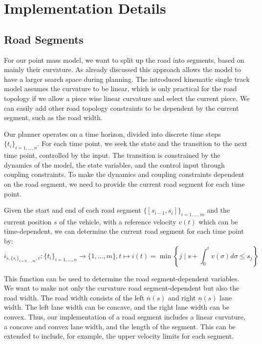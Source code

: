 \section{Implementation Details} \label{sec:implementation_details}

\subsection{Road Segments}

For our point mass model, we want to split up the road into segments, based on mainly their curvature.
As already discussed this approach allows the model to have a larger search space during planning.
The introduced kinematic single track model assumes the curvature to be linear, which is only practical for the road topology if we allow a piece
wise linear curvature and select the current piece.
We can easily add other road topology constraints to be dependent by the current segment, such as the road width.

Our planner operates on a time horizon, divided into discrete time steps $\{t_i\}_{i=1,\dots,n}$.
For each time point, we seek the state and the transition to the next time point, controlled by the input.
The transition is constrained by the dynamics of the model, the state variables, and the control input through coupling constraints.
To make the dynamics and coupling constraints dependent on the road segment, we need to provide the current road segment for each time point.

Given the start and end of each road segment $\{[s_{i-1}, s_{i}]\}_{i=1,\dots,m}$ and the current position $s$ of the vehicle, with a reference velocity
$v(t)$ which can be time-dependent, we can determine the current road segment for each time point by:
\begin{equation}
	i_{s, \{s_{i}\}_{i=0,\dots,m}, v}: \{t_i\}_{i=1,\dots,n} \to \{1,\dots,m\}, t \mapsto i(t) = \min \left\{ j \mid s + \int_{0}^{t} v(\sigma) d\sigma \leq s_j \right\}
\end{equation}

This function can be used to determine the road segment-dependent variables.
We want to make not only the curvature road segment-dependent but also the road width.
The road width consists of the left $\overline{n}(s)$ and right $\underline{n}(s)$ lane width.
The left lane width can be concave, and the right lane width can be convex.
Thus, our implementation of a road segment includes a linear curvature, a concave and convex lane width, and the length of the segment.
This can be extended to include, for example, the upper velocity limits for each segment.

